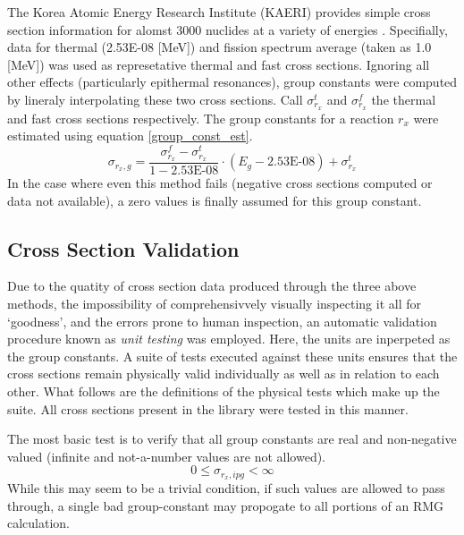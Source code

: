 The Korea Atomic Energy Research Institute (KAERI) provides simple cross section information
for alomst 3000 nuclides at a variety of energies \cite{KAER2000}.  Specifially, data for
thermal (2.53E-08 [MeV]) and fission spectrum average (taken as 1.0 [MeV]) was used as represetative
thermal and fast cross sections.  Ignoring all other effects (particularly epithermal resonances), 
group constants were computed by lineraly interpolating these two cross sections.  Call 
$\sigma_{r_x}^t$ and $\sigma_{r_x}^f$ the thermal and fast cross sections respectively.  The group
constants for a reaction $r_x$ were estimated using equation \ref{group_const_est}.
\begin{equation}
\label{group_const_est}
\sigma_{r_x,g} = \frac{\sigma_{r_x}^f - \sigma_{r_x}^t}{1 - \mbox{2.53E-08}} \cdot (E_g - \mbox{2.53E-08}) + \sigma_{r_x}^t
\end{equation}
In the case where even this method fails (negative cross sections computed or data not available), 
a zero values is finally assumed for this group constant.

\subsection{Cross Section Validation}
Due to the quatity of cross section data produced through the three above methods, the 
impossibility of comprehensivvely visually inspecting it all for `goodness', and the errors 
prone to human inspection, an automatic validation procedure known as \emph{unit testing}
was employed.  Here, the units are inperpeted as the group constants.   A suite of tests 
executed against these units ensures that the cross sections remain physically valid 
individually as well as in relation to each other. What follows are the definitions of the 
physical tests which make up the suite.  All cross sections present in the library were tested 
in this manner.

The most basic test is to verify that all group constants are real and non-negative valued 
(infinite and not-a-number values are not allowed).  
\begin{equation}
\label{nn_ut}
0 \le \sigma_{r_x,ipg} < \infty
\end{equation}
While this may seem to be a trivial 
condition, if such values are allowed to pass through, a single bad group-constant may 
propogate to all portions of an RMG calculation.

